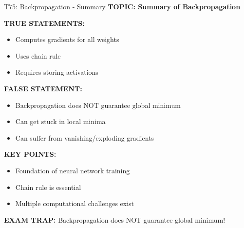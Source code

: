 \documentclass[8pt]{beamer}
\begin{document}
	\begin{frame}{T75: Backpropagation - Summary}
		\fontsize{6.5}{7.5}\selectfont
		\textbf{TOPIC: Summary of Backpropagation}
		
		\vspace{0.1cm}
		\textbf{TRUE STATEMENTS:}
		\begin{itemize}
			\item Computes gradients for all weights
			\item Uses chain rule
			\item Requires storing activations
		\end{itemize}
		
		\vspace{0.1cm}
		\textbf{FALSE STATEMENT:}
		\begin{itemize}
			\item Backpropagation does NOT guarantee global minimum
			\item Can get stuck in local minima
			\item Can suffer from vanishing/exploding gradients
		\end{itemize}
		
		\vspace{0.1cm}
		\textbf{KEY POINTS:}
		\begin{itemize}
			\item Foundation of neural network training
			\item Chain rule is essential
			\item Multiple computational challenges exist
		\end{itemize}
		
		\textcolor{myred}{\textbf{EXAM TRAP:}} Backpropagation does \textcolor{myred}{NOT} guarantee global minimum!
	\end{frame}
	
	
\end{document}
